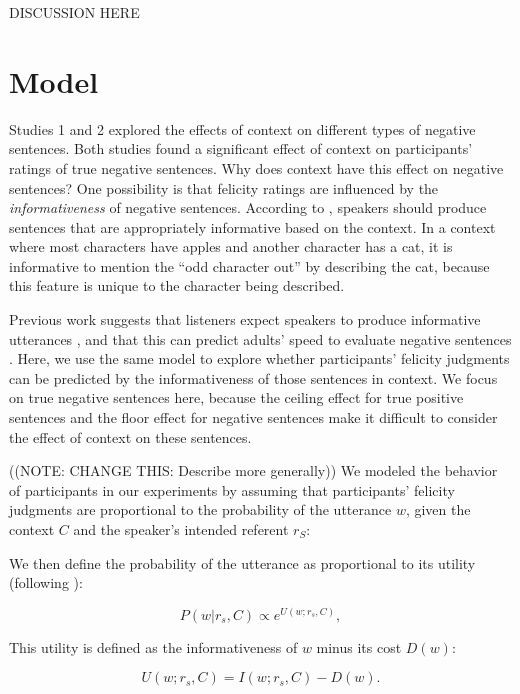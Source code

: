\documentclass[10pt,letterpaper]{article}
\begin{document}
DISCUSSION HERE


\section{Model}

Studies 1 and 2 explored the effects of context on different types of negative sentences.  Both studies found a significant effect of context on participants' ratings of true negative sentences.  Why does context have this effect on negative sentences?  One possibility is that felicity ratings are influenced by the \emph{informativeness} of negative sentences.  According to , speakers should produce sentences that are appropriately informative based on the context.  In a context where most characters have apples and another character has a cat, it is informative to mention the ``odd character out'' by describing the cat, because this feature is unique to the character being described.

Previous work suggests that listeners expect speakers to produce informative utterances \cite{frank2012}, and that this can predict adults' speed to evaluate negative sentences \cite{nordmeyer2013}.  Here, we use the same model to explore whether participants' felicity judgments can be predicted by the informativeness of those sentences in context.  We focus on true negative sentences here, because the ceiling effect for true positive sentences and the floor effect for negative sentences make it difficult to consider the effect of context on these sentences.  

((NOTE: CHANGE THIS: Describe more generally))
We modeled the behavior of participants in our experiments by assuming that participants' felicity judgments are proportional to the probability of the utterance $w$, given the context $C$ and the speaker's intended referent $r_S$:

\noindent We then define the probability of the utterance as proportional to its utility (following ):

\begin{equation}\label{eq:pw1}
P(w | r_s, C) \propto  e^{U(w;r_s,C)},
\end{equation} 

\noindent This utility is defined as the informativeness of $w$ minus its cost $D(w)$:

\begin{equation}\label{eq:utility}
U(w;r_s,C) = I(w;r_s, C) - D(w).
\end{equation}
\end{document}
